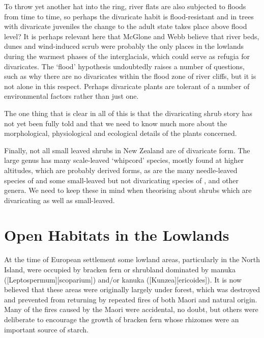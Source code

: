 To throw yet another hat into the ring, river flats are also subjected to floods from time to time, so perhaps the divaricate habit is flood-resistant and in trees with divaricate juveniles the change to the adult state takes place above flood level? It is perhaps relevant here that McGlone and Webb believe that river beds, dunes and wind-induced scrub were probably the only places in the lowlands during the warmest phases of the interglacials, which could serve as refugia for divaricates.
The `flood' hypothesis undoubtedly raises a number of questions, such as why there are no divaricates within the flood zone of river cliffs, but it is not alone in this respect.
Perhaps divaricate plants are tolerant of a number of environmental factors rather than just one.

The one thing that is clear in all of this is that the divaricating shrub story has not yet been fully told and that we need to know much more about the morphological, physiological and ecological details of the plants concerned.

Finally, not all small leaved shrubs in New Zealand are of divaricate form.
The large genus  has many scale-leaved `whipcord' species, mostly found at higher altitudes, which are probably derived forms, as are the many needle-leaved species of  and some small-leaved but not divaricating species of ,  and other genera.
We need to keep these in mind when theorising about shrubs which are divaricating as well as small-leaved.

\chapter{Open Habitats in the Lowlands}%
\label{ch:openhabitats}

At the time of European settlement some lowland areas, particularly in the North Island, were occupied by bracken fern or shrubland dominated by manuka ([Leptospermum][scoparium]) and/or kanuka ([Kunzea][ericoides]).
It is now believed that these areas were originally largely under forest, which was destroyed and prevented from returning by repeated fires of both Maori and natural origin.
Many of the fires caused by the Maori were accidental, no doubt, but others were deliberate to encourage the growth of bracken fern whose rhizomes were an important source of starch.


